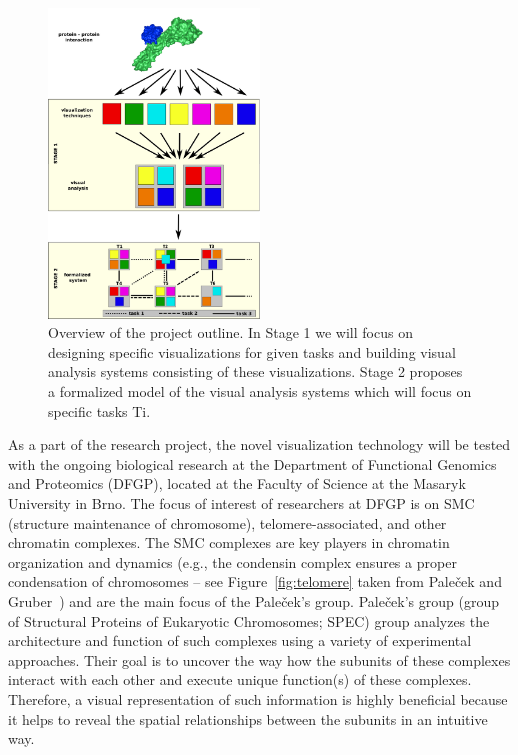 \documentclass[11pt,a4paper,titlepage,oneside,onecolumn]{article}
\begin{document}
\begin{figure}[htb]
\centering
\includegraphics[width=0.5\textwidth]{pics/system.png}
\caption{Overview of the project outline. In Stage 1 we will focus on designing specific visualizations for given tasks and building visual analysis systems consisting of these visualizations. Stage 2 proposes a formalized model of the visual analysis systems which will focus on specific tasks Ti.}
\label{fig:system}
\end{figure}


As a part of the research project, the novel visualization technology will be tested with the ongoing biological research at the Department of Functional Genomics and Proteomics (DFGP), located at the Faculty of Science at the Masaryk University in Brno. 
The focus of interest of researchers at DFGP is on SMC (structure maintenance of chromosome), telomere-associated, and other chromatin complexes. 
The SMC complexes are key players in chromatin organization and dynamics (e.g., the condensin complex ensures a proper condensation of chromosomes -- see Figure~\ref{fig:telomere} taken from Pale\v{c}ek and Gruber~\cite{Palecek2015}) and are the main focus of the Pale\v{c}ek's group.
Pale\v{c}ek's group (group of Structural Proteins of Eukaryotic Chromosomes; SPEC) group analyzes the architecture and function of such complexes using a variety of experimental approaches. 
Their goal is to uncover the way how the subunits of these complexes interact with each other and execute unique function(s) of these complexes. 
Therefore, a visual representation of such information is highly beneficial because it helps to reveal the spatial relationships between the subunits in an intuitive way.
\end{document}
